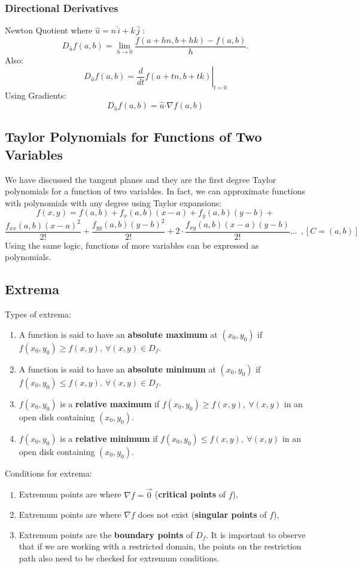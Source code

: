 \documentclass[12pt]{article}
\newcommand{\dotp}{{\boldsymbol \cdot}}
\begin{document}
\subsubsection{Directional Derivatives}
Newton Quotient where $\hat u = n \,\hat i+ k \,\hat j$ :
$$D_{\hat{u}} f(a,b)= \lim \limits_{h \to 0} \dfrac{f(a+hn,b+hk)-f(a,b)}{h} .$$
Also: $$D_{\hat{u}} f(a,b) =\left. \dfrac{d}{dt} f(a+tn,b+tk) \right|_{t=0}$$
Using Gradients:
$$D_{\hat{u}} f(a,b) = \hat u \dotp \nabla f(a,b)$$
\subsection{Taylor Polynomials for Functions of Two Variables}
We have discussed the tangent planes and they are the first degree Taylor polynomials for a function of two variables. In fact, we can approximate functions with polynomials with any degree using Taylor expansions: 
$$f(x,y)= f(a,b)+f_x(a,b)(x-a)+f_y(a,b)(y-b)+$$$$\frac{f_{xx}(a,b)(x-a)^2}{2!}+\frac{f_{yy}(a,b)(y-b)^2}{2!}+2\cdot \frac{f_{xy}(a,b)(x-a)(y-b)}{2!} \hdots \ \ , [C=(a,b)]$$
Using the same logic, functions of more variables can be expressed as polynomials.
\subsection{Extrema}
Types of extrema:
\begin{enumerate}
\item A function is said to have an \textbf{absolute maximum} at $(x_0,y_0)$ if \\ $f(x_0,y_0)\geq f(x,y),\  \forall (x,y)\in D_f$.
\item A function is said to have an \textbf{absolute minimum} at $(x_0,y_0)$ if \\ $f(x_0,y_0)\leq f(x,y),\  \forall (x,y)\in D_f$.
\item $f(x_0,y_0)$ is a \textbf{relative maximum} if $f(x_0,y_0) \geq f(x,y),\  \forall (x,y)$ in an open disk containing $(x_0,y_0)$.
\item $f(x_0,y_0)$ is a \textbf{relative minimum} if $f(x_0,y_0) \leq f(x,y),\  \forall (x,y)$ in an open disk containing $(x_0,y_0)$.
\end{enumerate}
Conditions for extrema:
\begin{enumerate}
\item Extremum points are where $\nabla f = \vec 0$ (\textbf{critical points} of $f$),
\item Extremum points are where $\nabla f$ does not exist (\textbf{singular points} of $f$),
\item Extremum points are the \textbf{boundary points} of $D_f$. It is important to observe that if we are working with a restricted domain, the points on the restriction path also need to be checked for extremum conditions.
\end{enumerate}
\end{document}
